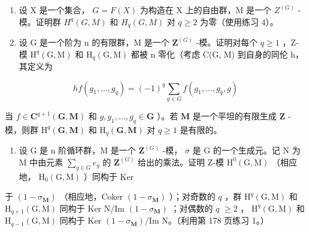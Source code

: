 \begin{enumerate}
\def\labelenumi{\arabic{enumi})}
\setcounter{enumi}{4}
\item
  设 X 是一个集合， \(G = F(X)\) 为构造在 X 上的自由群，M 是一个 \(Z^{(G)}\) -模。证明群 \(H^q(G, M)\) 和 \(H_q(G, M)\) 对 \(q \geqslant 2\) 为零（使用练习 4）。
\item
  设 G 是一个阶为 n 的有限群，M 是一个 \(\mathbf{Z}^{(G)}\) -模。证明对每个 \(q \geqslant 1\) ，Z-模 \(\mathrm{H}^{q}(\mathrm{G}, \mathrm{M})\) 和 \(\mathrm{H}_{q}(\mathrm{G}, \mathrm{M})\) 都被 n 零化（考虑 C(G, M) 到自身的同伦 h，其定义为
\end{enumerate}

\[
h f (g _ {1}, \dots , g _ {q}) = (- 1) ^ {q} \sum_ {g \in G} f (g _ {1}, \dots , g _ {q}, g)
\]

当 \(f \in \mathbf{C}^{q+1}(\mathbf{G}, \mathbf{M})\) 和 \(g, g_1, \ldots, g_q \in \mathbf{G}\) ）。若 \(\mathbf{M}\) 是一个平坦的有限生成 \(\mathbf{Z}\) -模，则群 \(\mathrm{H}^q(\mathbf{G}, \mathbf{M})\) 和 \(\mathrm{H}_q(\mathbf{G}, \mathbf{M})\) 对 \(q \geqslant 1\) 是有限的。

\begin{enumerate}
\def\labelenumi{\arabic{enumi})}
\setcounter{enumi}{6}
\tightlist
\item
  设 G 是 n 阶循环群，M 是一个 \(\mathbf{Z}^{(G)}\) -模， \(\sigma\) 是 G 的一个生成元。记 N 为 M 中由元素 \(\sum_{g\in G}e_{g}\) 的 \(\mathbf{Z}^{(G)}\) 给出的乘法。证明 Z-模 \(\mathrm{H}^{0}(\mathrm{G},\mathrm{M})\) （相应地， \(\mathrm{H}_{0}(\mathrm{G},\mathrm{M})\) ）同构于 Ker
\end{enumerate}

于 \((1 - \sigma_{\mathbf{M}})\) （相应地，Coker \((1 - \sigma_{\mathbf{M}})\) ）；对奇数的 \(q\) ，群 \(\mathrm{H}^q (\mathrm{G},\mathrm{M})\) 和 \(\mathrm{H}_{q + 1}(\mathrm{G},\mathrm{M})\) 同构于 Ker N/Im \((1 - \sigma_{\mathbf{M}})\) ；对偶数的 \(q\) \(\geqslant 2\) ， \(\mathrm{H}^q (\mathrm{G},\mathrm{M})\) 和 \(\mathrm{H}_{q - 1}(\mathrm{G},\mathrm{M})\) 同构于 Ker \((1 - \sigma_{\mathbf{M}}) / \mathrm{Im}\) N。（利用第 178 页练习 1。）

